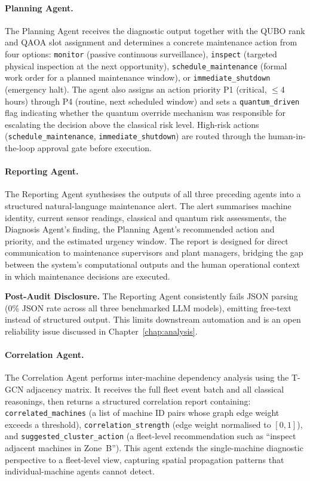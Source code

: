 \paragraph{Planning Agent.}
The Planning Agent receives the diagnostic output together with the QUBO rank and QAOA slot assignment and determines a concrete maintenance action from four options: \texttt{monitor} (passive continuous surveillance), \texttt{inspect} (targeted physical inspection at the next opportunity), \texttt{schedule\_maintenance} (formal work order for a planned maintenance window), or \texttt{immediate\_shutdown} (emergency halt). The agent also assigns an action priority P1 (critical, $\leq$4 hours) through P4 (routine, next scheduled window) and sets a \texttt{quantum\_driven} flag indicating whether the quantum override mechanism was responsible for escalating the decision above the classical risk level. High-risk actions (\texttt{schedule\_maintenance}, \texttt{immediate\_shutdown}) are routed through the human-in-the-loop approval gate before execution.

\paragraph{Reporting Agent.}
The Reporting Agent synthesises the outputs of all three preceding agents into a structured natural-language maintenance alert. The alert summarises machine identity, current sensor readings, classical and quantum risk assessments, the Diagnosis Agent's finding, the Planning Agent's recommended action and priority, and the estimated urgency window. The report is designed for direct communication to maintenance supervisors and plant managers, bridging the gap between the system's computational outputs and the human operational context in which maintenance decisions are executed.

\textbf{Post-Audit Disclosure.} The Reporting Agent consistently fails JSON parsing (0\% JSON rate across all three benchmarked LLM models), emitting free-text instead of structured output. This limits downstream automation and is an open reliability issue discussed in Chapter~\ref{chap:analysis}.

\paragraph{Correlation Agent.}
The Correlation Agent performs inter-machine dependency analysis using the T-GCN adjacency matrix. It receives the full fleet event batch and all classical reasonings, then returns a structured correlation report containing: \texttt{correlated\_machines} (a list of machine ID pairs whose graph edge weight exceeds a threshold), \texttt{correlation\_strength} (edge weight normalised to $[0,1]$), and \texttt{suggested\_cluster\_action} (a fleet-level recommendation such as ``inspect adjacent machines in Zone~B''). This agent extends the single-machine diagnostic perspective to a fleet-level view, capturing spatial propagation patterns that individual-machine agents cannot detect.

